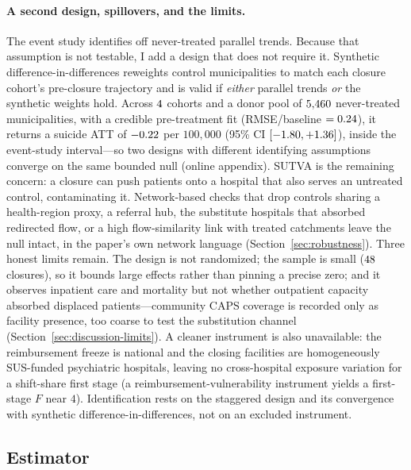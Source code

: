 \paragraph{A second design, spillovers, and the limits.} The event study
identifies off never-treated parallel trends. Because that assumption is
not testable, I add a design that does not require it. Synthetic
difference-in-differences \citep{arkhangelsky2021} reweights control
municipalities to match each closure cohort's pre-closure trajectory and is
valid if \emph{either} parallel trends \emph{or} the synthetic weights
hold. Across $4$ cohorts and a donor pool of $5{,}460$
never-treated municipalities, with a credible pre-treatment fit
(RMSE/baseline $= 0.24$), it returns a suicide ATT of
$-0.22$ per $100{,}000$ (95\% CI $[-1.80, +1.36]$), inside
the event-study interval---so two designs with different identifying
assumptions converge on the same bounded null (online appendix). SUTVA is
the remaining concern: a closure can push patients onto a hospital that
also serves an untreated control, contaminating it. Network-based checks
that drop controls sharing a health-region proxy, a referral hub, the
substitute hospitals that absorbed redirected flow, or a high
flow-similarity link with treated catchments leave the null intact, in the
paper's own network language (Section~\ref{sec:robustness}). Three honest
limits remain. The design is not randomized; the sample is small
($48$ closures), so it bounds large effects rather than
pinning a precise zero; and it observes inpatient care and mortality but
not whether outpatient capacity absorbed displaced patients---community
CAPS coverage is recorded only as facility presence, too coarse to test the
substitution channel (Section~\ref{sec:discussion-limits}). A cleaner
instrument is also unavailable: the reimbursement freeze is national and
the closing facilities are homogeneously SUS-funded psychiatric hospitals,
leaving no cross-hospital exposure variation for a shift-share first stage
(a reimbursement-vulnerability instrument yields a first-stage $F$ near
$4$). Identification rests on the staggered design and its convergence with
synthetic difference-in-differences, not on an excluded instrument.

\subsection{Estimator}
\label{sec:method-estimator}

